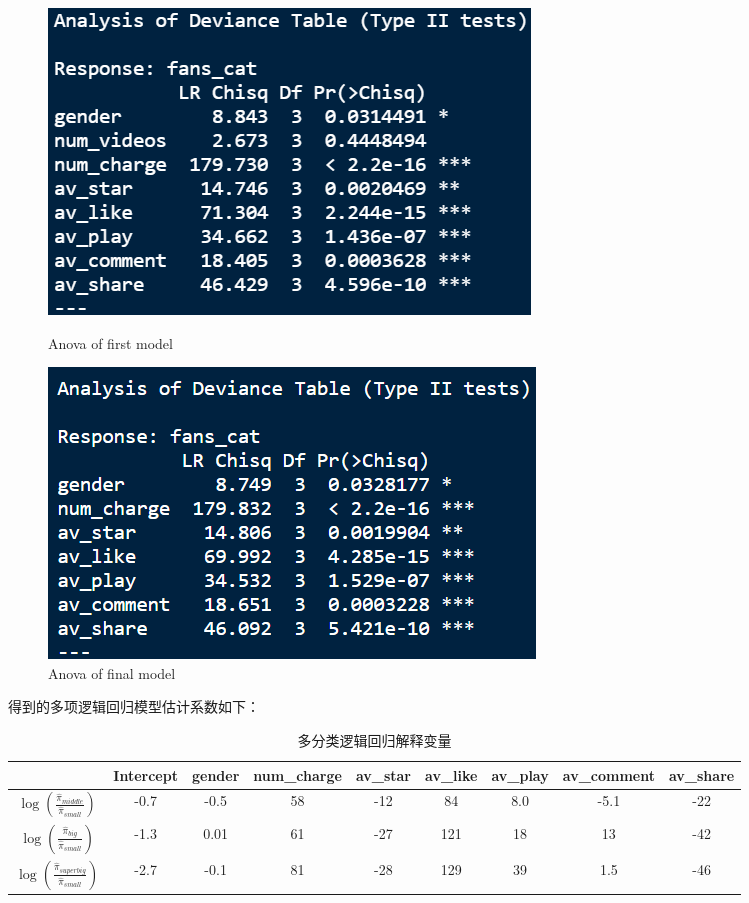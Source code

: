 \documentclass{ctexart}
\begin{document}
\begin{figure}[H]
    \centering
    \begin{minipage}[t]{0.48\textwidth}
        \centering
        \includegraphics[width=\textwidth]{MLR/AnovaMul1.png}
        \caption{Anova of first model}
    \end{minipage}
    \begin{minipage}[t]{0.48\textwidth}
        \centering
        \includegraphics[width=\textwidth]{MLR/AnovaMul2.png}
        \caption{Anova of final model}
    \end{minipage}
\end{figure}

得到的多项逻辑回归模型估计系数如下：

\begin{table}[H]
    \centering
    \begin{tabular}{ccccccccc}
        \toprule
          & Intercept & gender & num\_charge & av\_star
          & av\_like & av\_play & av\_comment & av\_share\\
        \midrule
          $\log(\frac{\hat\pi_{middle}}{\hat\pi_{small}})$ 
          & -0.7 & -0.5 & 58 & -12
          & 84 & 8.0 & -5.1 & -22\\
          $\log(\frac{\hat\pi_{big}}{\hat\pi_{small}})$
          & -1.3 & 0.01 & 61 & -27
          & 121 & 18 & 13 & -42\\
          $\log(\frac{\hat\pi_{super big}}{\hat\pi_{small}})$
          & -2.7 & -0.1 & 81 & -28
          & 129 & 39 & 1.5 & -46\\
        \bottomrule
     \end{tabular}
    \caption{多分类逻辑回归解释变量}
\end{table}
\end{document}
